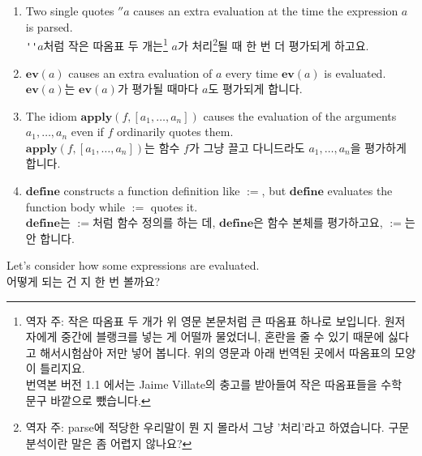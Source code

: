 \documentclass[12pt]{article}
\begin{document}
\begin{enumerate}
\item Two single quotes $''a$ causes an extra evaluation at the time the expression $a$ is parsed. \\
         \verb|''|$a$처럼 작은 따옴표 두 개는\footnote{역자 주:  작은 따옴표 두 개가 위 영문 본문처럼 큰 따옴표 하나로 보입니다. 원저자에게 중간에 블랭크를 넣는 게 어떨까 물었더니, 혼란을 줄 수 
있기 때문에 싫다고 해서시험삼아 저만 넣어 봅니다. 위의 영문과 아래 번역된 곳에서 따옴표의 모양이 틀리지요. \\ 번역본 버전 1.1 에서는 Jaime Villate의 충고를 받아들여 작은 따옴표들을 수학 문구 바깥으로 뺐습니다.} $a$가 처리\footnote{역자 주: parse에 적당한 우리말이 뭔 지 몰라서 그냥 '처리'라고 하였습니다. 구문 분석이란 말은 좀 어렵지 않나요?}될 때 한 번 더 평가되게 하고요. 
\item $\mathbf{ev}(a)$ causes an extra evaluation of $a$ every time $\mathbf{ev}(a)$ is evaluated. \\
        $\mathbf{ev}(a)$는 $\mathbf{ev}(a)$가 평가될 때마다 $a$도 평가되게 합니다. 
\item The idiom $\mathbf{apply}(f, [a_1, \ldots, a_n])$ causes the evaluation
    of the arguments $a_1, \ldots, a_n$ even if $f$ ordinarily quotes them. \\
        $\mathbf{apply}(f, [a_1, \ldots, a_n])$는 함수 $f$가 그냥 끌고 다니드라도 $a_1, \ldots, a_n$을 평가하게 합니다.
\item $\mathbf{define}$ constructs a function definition like $\mathbf{:=}$,
    but $\mathbf{define}$ evaluates the function body while $\mathbf{:=}$ quotes it. \\
       $\mathbf{define}$는 $\mathbf{:=}$처럼 함수 정의를 하는 데, $\mathbf{define}$은 함수 본체를 평가하고요, $\mathbf{:=}$는 안 합니다.
\end{enumerate}

Let's consider how some expressions are evaluated. \\
어떻게 되는 건 지 한 번 볼까요?
\end{document}
